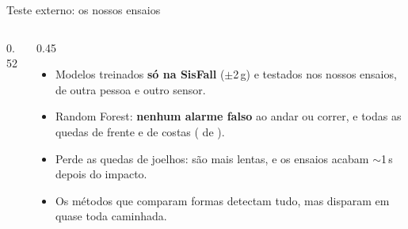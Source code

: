 \documentclass[aspectratio=169,10pt]{beamer}
\begin{document}
\begin{frame}{Teste externo: os nossos \nProprios{} ensaios}
  \begin{columns}[T,onlytextwidth]
    \begin{column}{0.52\textwidth}
      \centering
      {\scriptsize}
    \end{column}
    \begin{column}{0.45\textwidth}
      \begin{itemize}
        \item Modelos treinados \textbf{só na SisFall} ($\pm$2\,g) e testados nos nossos ensaios, de outra pessoa e
              outro sensor.
        \item Random Forest: \textbf{nenhum alarme falso} ao andar ou correr, e todas as quedas de frente e de costas
              (\rfPropriosQuedas{} de \nPropriosQueda).
        \item Perde as quedas de joelhos: são mais lentas, e os ensaios acabam $\sim$1\,s depois do impacto.
        \item Os métodos que comparam formas detectam tudo, mas disparam em quase toda caminhada.
      \end{itemize}
    \end{column}
  \end{columns}
\end{frame}
\end{document}
